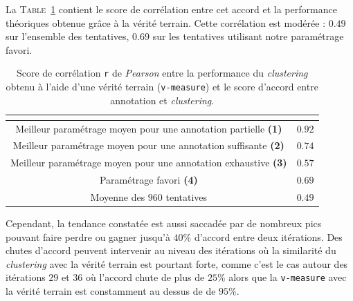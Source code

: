 			La \textsc{Table~\ref{table:4.5.1-ETUDE-RENTABILITE-CORRELATION-ACCORD-PERFORMANCE}} contient le score de corrélation entre cet accord et la performance théoriques obtenue grâce à la vérité terrain.
			Cette corrélation est modérée : $0.49$ sur l'ensemble des tentatives, $0.69$ sur les tentatives utilisant notre paramétrage favori.
			\begin{table}[!htb]
				\begin{center}
				\begin{tabular}{|c|r|}
				
					\hline
					\rowcolor{colorTableHeader!15}
					\multicolumn{1}{|c|}{\shortstack[c]{
						Paramétrage
					}}
						& \multicolumn{1}{c|}{\shortstack[c]{
							Corrélation \texttt{r}
						}}
						\tabularnewline
						\hline \hline
					
					Meilleur paramétrage moyen pour une annotation partielle \textbf{(1)}
						& $0.92$
						\tabularnewline
						\hline
					
					Meilleur paramétrage moyen pour une annotation suffisante \textbf{(2)}
						& $0.74$
						\tabularnewline
						\hline
					
					Meilleur paramétrage moyen pour une annotation exhaustive \textbf{(3)}
						& $0.57$
						\tabularnewline
						\hline
					
					Paramétrage favori \textbf{(4)}
						& $0.69$
						\tabularnewline
						\hline
					
					Moyenne des $960$ tentatives
						& $0.49$
						\tabularnewline
						\hline
					
				\end{tabular}
				\end{center}
				\caption{
					Score de corrélation \texttt{r} de \textit{Pearson} entre la performance du \textit{clustering} obtenu à l'aide d'une vérité terrain (\texttt{v-measure}) et le score d'accord entre annotation et \textit{clustering}.
				}
				\label{table:4.5.1-ETUDE-RENTABILITE-CORRELATION-ACCORD-PERFORMANCE}
			\end{table}
			
			Cependant, la tendance constatée est aussi saccadée par de nombreux pics pouvant faire perdre ou gagner jusqu'à $40$\% d'accord entre deux itérations.
			Des chutes d'accord peuvent intervenir au niveau des itérations où la similarité du \textit{clustering} avec la vérité terrain est pourtant forte, comme c'est le cas autour des itérations $29$ et $36$ où l'accord chute de plus de $25$\% alors que la \texttt{v-measure} avec la vérité terrain est constamment au dessus de de $95$\%.
			
